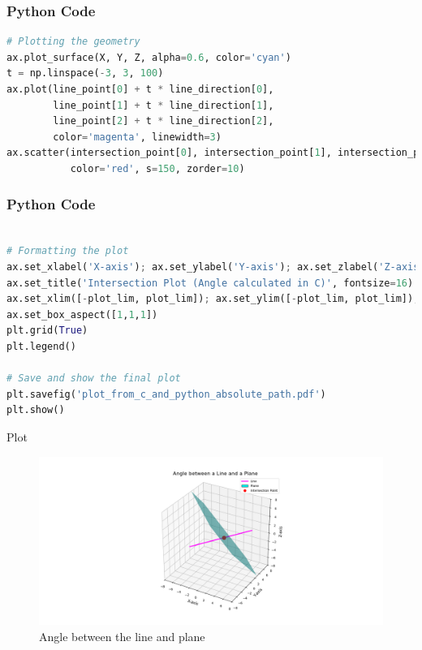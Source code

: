 \documentclass{beamer}
\begin{document}
\begin{frame}[fragile]
    \frametitle{Python Code}
    \begin{lstlisting}[language=Python]
# Plotting the geometry
ax.plot_surface(X, Y, Z, alpha=0.6, color='cyan')
t = np.linspace(-3, 3, 100)
ax.plot(line_point[0] + t * line_direction[0], 
        line_point[1] + t * line_direction[1], 
        line_point[2] + t * line_direction[2], 
        color='magenta', linewidth=3)
ax.scatter(intersection_point[0], intersection_point[1], intersection_point[2], 
           color='red', s=150, zorder=10)
    \end{lstlisting}
\end{frame}

\begin{frame}[fragile]
    \frametitle{Python Code}
    \begin{lstlisting}[language=Python]

# Formatting the plot
ax.set_xlabel('X-axis'); ax.set_ylabel('Y-axis'); ax.set_zlabel('Z-axis')
ax.set_title('Intersection Plot (Angle calculated in C)', fontsize=16)
ax.set_xlim([-plot_lim, plot_lim]); ax.set_ylim([-plot_lim, plot_lim]); ax.set_zlim([-plot_lim, plot_lim])
ax.set_box_aspect([1,1,1])
plt.grid(True)
plt.legend()

# Save and show the final plot
plt.savefig('plot_from_c_and_python_absolute_path.pdf')
plt.show()
    \end{lstlisting}
\end{frame}

\begin{frame}{Plot}
    \begin{figure}
        \centering
        \includegraphics[width=0.7\columnwidth]{../figs/pure_python.png}
        \caption{Angle between the line and plane}
        \label{fig:final_plot}
    \end{figure}
\end{frame}
\end{document}
